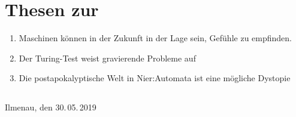 %
%
%
%

\chapter*{Thesen zur \artderausarbeitung}

\begin{enumerate}
\item Maschinen können in der Zukunft in der Lage sein, Gefühle zu empfinden.
\item Der Turing-Test weist gravierende Probleme auf
\item Die postapokalyptische Welt in Nier:Automata ist eine mögliche Dystopie
\end{enumerate}

\section*{}

Ilmenau, den 30.\,05.\,2019\hfill \namedesautors
